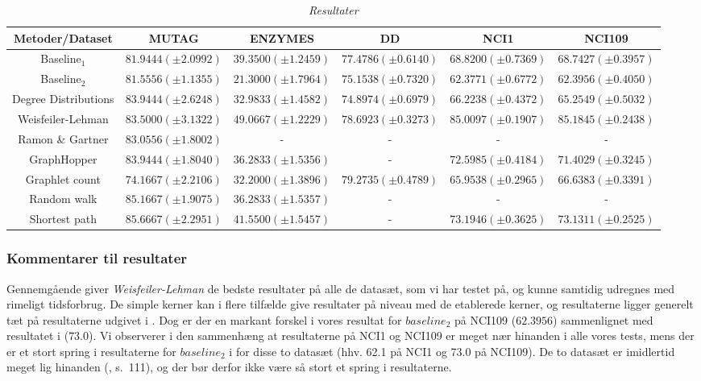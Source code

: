 \documentclass{article}
\begin{document}
\begin{table}[H]
\centering
\hspace*{-0.7in}
\scalebox{0.7} {
\begin{tabular}{c|c|c|c|c|c}
Metoder/Dataset & MUTAG & ENZYMES & DD & NCI1 & NCI109 \\
\hline
Baseline$_1$ \cite{trivial-kernels} & \boldmath$81.9444(\pm 2.0992)$ & $39.3500(\pm 1.2459)$ & $77.4786(\pm 0.6140)$ & $68.8200(\pm 0.7369)$ & $68.7427(\pm 0.3957)$ \\
Baseline$_2$ \cite{trivial-kernels} & \boldmath$81.5556 (\pm 1.1355)$ & $21.3000 (\pm 1.7964)$ & $75.1538 (\pm 0.7320)$ & $62.3771 (\pm 0.6772)$ & $62.3956 (\pm 0.4050)$ \\
Degree Distributions &\boldmath$83.9444 (\pm 2.6248)$ &  $32.9833 (\pm 1.4582)$ & $74.8974 (\pm 0.6979)$ & $66.2238 (\pm 0.4372)$ & $65.2549 (\pm 0.5032)$ \\
Weisfeiler-Lehman \cite{WL} & \boldmath$83.5000 (\pm 3.1322)$ & \boldmath$49.0667 (\pm 1.2229)$ & \boldmath$78.6923 (\pm 0.3273)$ & \boldmath$85.0097 (\pm 0.1907)$ & \boldmath$85.1845 (\pm 0.2438)$ \\
Ramon \& Gartner \cite{RG} & \boldmath$83.0556 (\pm 1.8002)$ & - & - & - & - \\
GraphHopper \cite{graphhopper} & \boldmath$83.9444 (\pm 1.8040)$ & $36.2833 (\pm 1.5356)$ & - & $72.5985 (\pm 0.4184)$ & $71.4029 (\pm 0.3245)$ \\
Graphlet count \cite{GC} & $74.1667 (\pm 2.2106)$ & $32.2000 (\pm 1.3896)$ & \boldmath$79.2735 (\pm 0.4789)$ & $65.9538 (\pm 0.2965)$ & $66.6383 (\pm 0.3391)$ \\
Random walk \cite{RW} & \boldmath$85.1667 (\pm 1.9075)$ & $36.2833 (\pm 1.5357)$ & - & - & - \\
Shortest path \cite{shortest-path} & \boldmath$85.6667 (\pm 2.2951)$ & $41.5500 (\pm 1.5457)$ & - & $73.1946 (\pm 0.3625)$ & $73.1311 (\pm 0.2525)$ \\
\end{tabular}
}
\caption{\textit{Resultater}}
\label{table:results}
\end{table}

\subsubsection{Kommentarer til resultater}
\label{section:result_comments}
Gennemgående giver \textit{Weisfeiler-Lehman} de bedste resultater på alle de datasæt, som vi har testet på, og kunne samtidig udregnes med rimeligt tidsforbrug. De simple kerner kan i flere tilfælde give resultater på niveau med de etablerede kerner, og resultaterne ligger generelt tæt på resultaterne udgivet i \cite{trivial-kernels}. Dog er der en markant forskel i vores resultat for $baseline_2$ på NCI109 ($62.3956$) sammenlignet med resultatet i \cite{trivial-kernels} ($73.0$). Vi observerer i den sammenhæng at resultaterne på NCI1 og NCI109 er meget nær hinanden i alle vores tests, mens der er et stort spring i resultaterne for $baseline_2$ i \cite{trivial-kernels} for disse to datasæt (hhv. 62.1 på NCI1 og 73.0 på NCI109). De to datasæt er imidlertid meget lig hinanden (\cite{graph-datasets}, s.\ 111), og der bør derfor ikke være så stort et spring i resultaterne.
\end{document}
